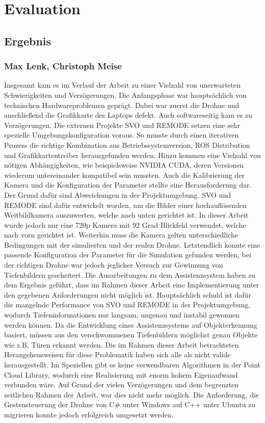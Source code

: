\chapter{Evaluation}
\section{Ergebnis}
\subsection*{Max Lenk, Christoph Meise}
Insgesamt kam es im Verlauf der Arbeit zu einer Vielzahl von unerwarteten Schwierigkeiten und Verzögerungen. Die Anfangsphase war hauptsächlich von technischen Hardwareproblemen geprägt. Dabei war zuerst die Drohne und anschließend die Grafikkarte des Laptops defekt. \newline
Auch softwareseitig kam es zu Verzögerungen. Die externen Projekte SVO und REMODE setzen eine sehr spezielle Umgebungskonfiguration voraus. So musste durch einen iterativen Prozess die richtige Kombination aus Betriebssystemversion, ROS Distribution und Grafikkartentreiber herausgefunden werden. Hinzu kommen eine Vielzahl von nötigen Abhängigkeiten, wie beispielsweise NVIDIA CUDA, deren Versionen wiederum untereinander kompatibel sein mussten.  \newline
Auch die Kalibrierung der Kamera und die Konfiguration der Parameter stellte eine Herausforderung dar. Der Grund dafür sind Abweichungen in der Projektumgebung. SVO und REMODE sind dafür entwickelt worden, um die Bilder einer hochauflösenden Weitbildkamera auszuwerten, welche nach unten gerichtet ist. In dieser Arbeit wurde jedoch nur eine 720p Kamera mit 92 Grad Blickfeld verwendet, welche nach vorn gerichtet ist. Weiterhin muss die Kamera gelten unterschiedliche Bedingungen mit der simulierten und der realen Drohne. \newline
Letztendlich konnte eine passende Konfiguration der Parameter für die Simulation gefunden werden, bei der richtigen Drohne war jedoch jeglicher Versuch zur Gewinnung von Tiefenbildern gescheitert. \newline
Die Ausarbeitungen zu dem Assistenzsystem haben zu dem Ergebnis geführt, dass im Rahmen dieser Arbeit eine Implementierung unter den gegebenen Anforderungen nicht möglich ist. Hauptsächlich schuld ist dafür die mangelnde Performance von SVO und REMODE in der Projektumgebung, wodurch Tiefeninformationen nur langsam, ungenau und instabil gewonnen werden können. Da die Entwicklung eines Assistenzsystems auf Objekterkennung basiert, müssen aus den verschwommenen Tiefenbildern möglichst genau Objekte wie z.B. Türen erkannt werden. Die im Rahmen dieser Arbeit betrachteten Herangehensweisen für diese Problematik haben sich alle als nicht valide herausgestellt. Im Speziellen gibt es keine verwendbaren Algorithmen in der Point Cloud Library, wodurch eine Realisierung mit enorm hohem Eigenaufwand verbunden wäre. Auf Grund der vielen Verzögerungen und dem begrenzten zeitlichen Rahmen der Arbeit, war dies nicht mehr möglich.
Die Anforderung, die Gestensteuerung der Drohne von C\# unter Windows auf C++ unter Ubuntu zu migrieren konnte jedoch erfolgreich umgesetzt werden.

